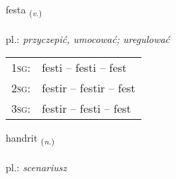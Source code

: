 \documentclass[frontgrid, backgrid]{flacards}\usepackage[]{graphicx}\usepackage[]{xcolor}
\begin{document}
\renewcommand{\flhead}{\vskip5pt \fboxsep=0pt {\small\bfseries\footnotesize Sagnorð | Verb}}
\renewcommand{\fcfoot}{\vskip5pt \fboxsep=0pt \hspace{2pt}{\small\bfseries\footnotesize 2K}}

\renewcommand{\blhead}{\vskip5pt {\small\bfseries\footnotesize Sagnorð | Verb }}
\renewcommand{\bcfoot}{\vskip5pt \hspace{2pt}{\small\bfseries\footnotesize 2K}}


{festa \small{\textsubscript{(\textit{v.})}} \\[1ex] %
\textphonetic{[fɛsta]} \\
pl.: \emph{przyczepić, umocować; uregulować} \\  [2ex]
\renewcommand*{\arraystretch}{0.8}
\begin{tabular}{p{1cm}l}
\textsc{1sg}: & festi -- festi -- fest \\ 
\textsc{2sg}: & festir -- festir -- fest \\ 
\textsc{3sg}: & festir -- festi -- fest \\ 
\end{tabular}
}

\renewcommand{\flhead}{\vskip5pt \fboxsep=0pt {\small\bfseries\footnotesize Nafnorð | Noun}}
\renewcommand{\fcfoot}{\vskip5pt \fboxsep=0pt \hspace{2pt}{\small\bfseries\footnotesize 2K}}

\renewcommand{\blhead}{\vskip5pt {\small\bfseries\footnotesize Nafnorð | Noun }}
\renewcommand{\bcfoot}{\vskip5pt \hspace{2pt}{\small\bfseries\footnotesize 2K}}


{handrit \small{\textsubscript{(\textit{n.})}} \\[1ex] %
\textphonetic{[hantrɪt]} \\
pl.: \emph{scenariusz} \\  [2ex]
\renewcommand*{\arraystretch}{0.8}
}
\end{document}
